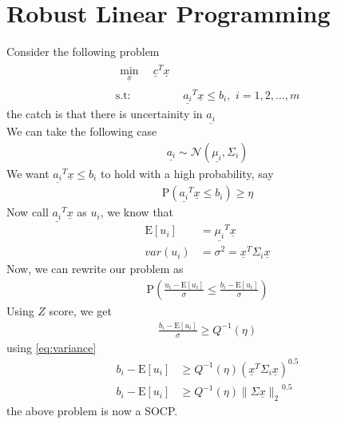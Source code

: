 \documentclass{tufte-handout}
\theoremstyle{remark}
\renewcommand{\vec}[1]{\underline{#1}}
\newcommand\norm[1]{\ensuremath{\lVert#1\rVert_2}}
\newcommand\twospace{\,\,}
\begin{document}
\section{Robust Linear Programming}
Consider the following problem
\begin{align}
    \begin{split}
        \min_{\vec{x}}\, &\twospace \vec{c}^T\vec{x}
    \end{split}\\ 
    \text{s.t:}
    \twospace & \vec{a_i}^T\vec{x} \leq b_i, \twospace i = 1,2,\dots, m
\end{align}
the catch is that there is uncertainity in $\vec{a_i}$\\
We can take the following case
\begin{align}
    \vec{a_i} \sim \mathcal{N}(\vec{\mu_i}, \Sigma_i)
\end{align}
We want $\vec{a_i}^T\vec{x} \leq b_i$ to hold with a high probability, say
\begin{align}
    \text{P}(\vec{a_i}^T\vec{x} \leq b_i) \geq \eta
\end{align}
Now call $\vec{a_i}^T\vec{x}$ as $u_i$, we know that
\begin{align}
    \text{E}[u_i] &= \vec{\mu_i}^T\vec{x}\\
    var(u_i) &= \sigma^2 =  \vec{x}^T\Sigma_i\vec{x} \label{eq:variance}
\end{align}
Now, we can rewrite our problem as 
\begin{align}
    \text{P}\left(\frac{u_i-\text{E}[u_i]}{\sigma} \leq \frac{b_i-\text{E}[u_i]}{\sigma}\right)
\end{align}
Using $Z$ score, we get 
\begin{align}
    \frac{b_i-\text{E}[u_i]}{\sigma} \geq Q^{-1}(\eta)
\end{align}
using \eqref{eq:variance}
\begin{align}
    b_i-\text{E}[u_i] &\geq Q^{-1}(\eta) \left(\vec{x}^T\Sigma_i\vec{x}\right)^{0.5} \\
    b_i-\text{E}[u_i] &\geq Q^{-1}(\eta) \norm{\Sigma \vec{x}}^{0.5} 
\end{align} 
the above problem is now a SOCP.
\end{document}

